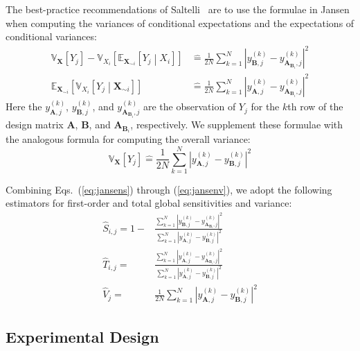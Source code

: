 \documentclass[12pt]{article}
\begin{document}
The best-practice recommendations of Saltelli~\cite{saltelli_variance_2010} are to use the formulae in Jansen~\cite{jansen_analysis_1999} when computing the variances of conditional expectations and the expectations of conditional variances:
\begin{align}
    \mathbb{V}_\mathbf{X} \left[ Y_j \right] - \mathbb{V}_{X_i} \left[ \mathbb{E}_{\mathbf{X}_{\sim i}} \left[ Y_j \middle| X_i \right] \right] & \mathrel{\hat=} \frac{1}{2 N} \sum_{k=1}^N \left| y_{\mathbf{B},j}^{(k)} - y_{\mathbf{A}_{\mathbf{B}_i},j}^{(k)} \right|^2 \label{eq:jansens}
    \\
    \mathbb{E}_{\mathbf{X}_{\sim i}} \left[ \mathbb{V}_{X_i} \left[ Y_j \middle| \mathbf{X}_{\sim i} \right] \right] & \mathrel{\hat=} \frac{1}{2 N} \sum_{k=1}^N \left| y_{\mathbf{A},j}^{(k)} - y_{\mathbf{A}_{\mathbf{B}_i},j}^{(k)} \right|^2 \label{eq:jansent}
\end{align}
Here the $y_{\mathbf{A},j}^{(k)}$, $y_{\mathbf{B},j}^{(k)}$, and $y_{\mathbf{A}_{\mathbf{B}_i},j}^{(k)}$ are the observation of $Y_j$ for the $k$th row of the design matrix $\mathbf{A}$, $\mathbf{B}$, and $\mathbf{A}_{\mathbf{B}_i}$, respectively. We supplement these formulae with the analogous formula for computing the overall variance:
\begin{equation}
    \mathbb{V}_\mathbf{X} \left[ Y_j \right] \mathrel{\hat=} \frac{1}{2 N} \sum_{k=1}^N \left| y_{\mathbf{A},j}^{(k)} - y_{\mathbf{B},j}^{(k)} \right|^2 \label{eq:jansenv}
\end{equation}

Combining Eqs.~(\ref{eq:jansens}) through (\ref{eq:jansenv}), we adopt the following estimators for first-order and total global sensitivities and variance:
\begin{align}
    \hat{S}_{i,j} = 1 - & \frac{\sum_{k=1}^N \left| y_{\mathbf{B},j}^{(k)} - y_{\mathbf{A}_{\mathbf{B}_i},j}^{(k)} \right|^2}{\sum_{k=1}^N \left| y_{\mathbf{A},j}^{(k)} - y_{\mathbf{B},j}^{(k)} \right|^2} \label{eq:ours}
    \\
    \hat{T}_{i,j} = & \frac{\sum_{k=1}^N \left| y_{\mathbf{A},j}^{(k)} - y_{\mathbf{A}_{\mathbf{B}_i},j}^{(k)} \right|^2}{\sum_{k=1}^N \left| y_{\mathbf{A},j}^{(k)} - y_{\mathbf{B},j}^{(k)} \right|^2} \label{eq:ourt}
    \\
    \hat{V}_{j} = & \frac{1}{2 N} \sum_{k=1}^N \left| y_{\mathbf{A},j}^{(k)} - y_{\mathbf{B},j}^{(k)} \right|^2 \label{eq:ourv}
\end{align}


\subsection{Experimental Design}
\label{sec:design}
\end{document}
